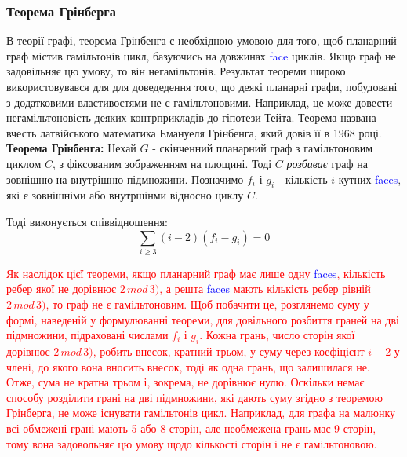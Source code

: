 \documentclass[14pt]{article}
\begin{document}
\begin{spacing}{1.175}
            \subsubsection{\normalfont Теорема Грінберга}
            \qquad В теорії графі, теорема Грінбенга є необхідною умовою для того, щоб планарний граф містив гамільтонів цикл, базуючись на довжинах \textcolor{blue}{face} циклів. Якщо граф не задовільняє цю умову, то він негамільтонів. Результат теореми широко використовувався для для доведедення того, що деякі планарні графи, побудовані з додатковими властивостями не є гамільтоновими. Наприклад, це може довести негамільтоновість деяких контрприкладів до гіпотези Тейта. Теорема названа вчесть латвійського математика Емануеля Грінбенга, який довів її в 1968 році.
            \\

            \textbf{Теорема Грінбенга:} Нехай \(G\) - скінченний планарний граф з гамільтоновим циклом \(C\), з фіксованим зображенням на площині. Тоді \(C\) \textit{розбиває} граф на зовнішню на внутрішню підмножини. Позначимо \(f_i\) і \(g_i\) - кількість \(i\)-кутних \textcolor{blue}{faces}, які є зовнішніми або внутршінми відносно циклу \(C\). 
            
            Тоді виконується співвідношення: $$ \sum_{i\ge3} (i - 2)(f_i - g_i) = 0 $$

            \textcolor{red}{Як наслідок цієї теореми, якщо планарний граф має лише одну \textcolor{blue}{faces}, кількість ребер якої не дорівнює \(2\,mod\,3)\), а решта \textcolor{blue}{faces} мають кількість ребер рівній \(2\,mod\,3)\), то граф не є гамільтоновим. Щоб побачити це, розглянемо суму у формі, наведеній у формулюванні теореми, для довільного розбиття граней на дві підмножини, підраховані числами \(f_i\) і \(g_i\). Кожна грань, число сторін якої дорівнює \(2\,mod\,3)\), робить внесок, кратний трьом, у суму через коефіцієнт \(i-2\) у члені, до якого вона вносить внесок, тоді як одна грань, що залишилася не. Отже, сума не кратна трьом і, зокрема, не дорівнює нулю. Оскільки немає способу розділити грані на дві підмножини, які дають суму згідно з теоремою Грінберга, не може існувати гамільтонів цикл. Наприклад, для графа на малюнку всі обмежені грані мають 5 або 8 сторін, але необмежена грань має 9 сторін, тому вона задовольняє цю умову щодо кількості сторін і не є гамільтоновою.}


\end{spacing}
\end{document}
